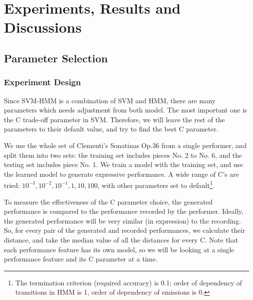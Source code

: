 \chapter{Experiments, Results and Discussions}
\label{chap:exp}
\section{Parameter Selection}
\subsection{Experiment Design}
Since SVM-HMM is a combination of SVM and HMM, there are many parameters which needs adjustment from both model. The most important one is the C trade-off parameter in SVM. Therefore, we will leave the rest of the parameters to their default value, and try to find the best C parameter.

We use the whole set of Clementi's Sonatinas Op.36 from a single performer, and split them into two sets: the training set includes pieces No. 2 to No. 6, and the testing set includes piece No. 1. We train a model with the training set, and use the learned model to generate expressive performance. A wide range of C's are tried: $10^{-3}, 10^{-2}, 10^{-1}, 1, 10, 100$, with other parameters set to default\footnote{The termination criterion (required accuracy) is 0.1; order of dependency of transitions in HMM is 1, order of dependency of emissions is 0.}.



To measure the effectiveness of the C parameter choice, the generated performance is compared to the performance recorded by the performer. Ideally, the generated performance will be very similar (in expression) to the recording. So, for every pair of the generated and recorded performances, we calculate their distance, and take the median value of all the distances for every C. Note that each performance feature has its own model, so we will be looking at a single performance feature and its C parameter at a time.

